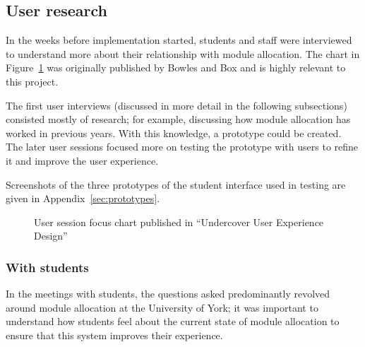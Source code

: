 
\subsection{User research}

In the weeks before implementation started, students and staff were
interviewed to understand more about their relationship with module
allocation. The chart in Figure~\ref{bowles_dualpurpose_chart} was originally
published by Bowles and Box and is highly relevant to this project.

The first user interviews (discussed in more detail in the following
subsections) consisted mostly of research; for example, discussing how module
allocation has worked in previous years. With this knowledge, a prototype
could be created. The later user sessions focused more on testing the
prototype with users to refine it and improve the user experience.

Screenshots of the three prototypes of the student interface used in testing
are given in Appendix~\ref{sec:prototypes}.

\begin{figure}
  \begin{center}
  \end{center}
  \caption{User session focus chart published in ``Undercover User Experience Design'' \cite{bowles2011undercover}}
  \label{bowles_dualpurpose_chart}
\end{figure}

\subsubsection{With students}

In the meetings with students, the questions asked predominantly revolved
around module allocation at the University of York; it was important to
understand how students feel about the current state of module allocation to
ensure that this system improves their experience.

